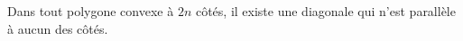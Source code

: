 Dans tout polygone convexe à $2n$ côtés, il existe une diagonale qui n'est parallèle à aucun des côtés.
